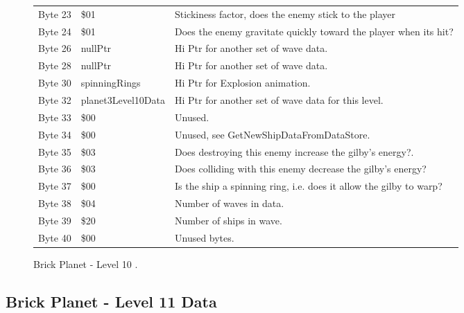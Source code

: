 \begin{figure}[H]
{\begin{adjustbox}{width=12cm}
\begin{tabular}{lll}
 Byte 23 & \$01                        & Stickiness factor, does the enemy stick to the player              \\
 Byte 24 & \$01                        & Does the enemy gravitate quickly toward the player when its hit?   \\
 Byte 26 & nullPtr                    & Hi Ptr for another set of wave data.                               \\
 Byte 28 & nullPtr                    & Hi Ptr for another set of wave data.                               \\
 Byte 30 & spinningRings              & Hi Ptr for Explosion animation.                                    \\
 Byte 32 & planet3Level10Data         & Hi Ptr for another set of wave data for this level.                \\
 Byte 33 & \$00                        & Unused.                                                            \\
 Byte 34 & \$00                        & Unused, see GetNewShipDataFromDataStore.                           \\
 Byte 35 & \$03                        & Does destroying this enemy increase the gilby's energy?.           \\
 Byte 36 & \$03                        & Does colliding with this enemy decrease the gilby's energy?        \\
 Byte 37 & \$00                        & Is the ship a spinning ring, i.e. does it allow the gilby to warp? \\
 Byte 38 & \$04                        & Number of waves in data.                                           \\
 Byte 39 & \$20                        & Number of ships in wave.                                           \\
 Byte 40 & \$00                        & Unused bytes.                                                      \\
\bottomrule
\end{tabular}

  \end{adjustbox}

  }\caption*{Brick Planet - Level 10
.}
\end{figure}

\clearpage
\subsection{Brick Planet - Level 11 Data}

